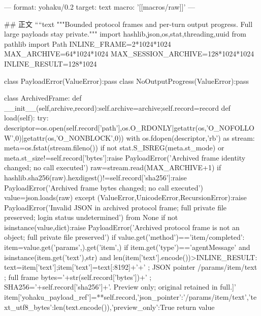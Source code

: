 ---
format: yohaku/0.2
target: text
macro: '[[macros/raw]]'
---

## 正文
````text
"""Bounded protocol frames and per-turn output progress. Full large payloads stay private."""
import hashlib,json,os,stat,threading,uuid
from pathlib import Path
INLINE_FRAME=2*1024*1024
MAX_ARCHIVE=64*1024*1024
MAX_SESSION_ARCHIVE=128*1024*1024
INLINE_RESULT=128*1024

class PayloadError(ValueError):pass
class NoOutputProgress(ValueError):pass

class ArchivedFrame:
 def __init__(self,archive,record):self.archive=archive;self.record=record
 def load(self):
  try:
   descriptor=os.open(self.record['path'],os.O_RDONLY|getattr(os,'O_NOFOLLOW',0)|getattr(os,'O_NONBLOCK',0))
   with os.fdopen(descriptor,'rb') as stream:
    meta=os.fstat(stream.fileno())
    if not stat.S_ISREG(meta.st_mode) or meta.st_size!=self.record['bytes']:raise PayloadError('Archived frame identity changed; no call executed')
    raw=stream.read(MAX_ARCHIVE+1)
   if hashlib.sha256(raw).hexdigest()!=self.record['sha256']:raise PayloadError('Archived frame bytes changed; no call executed')
   value=json.loads(raw)
  except (ValueError,UnicodeError,RecursionError):raise PayloadError('Invalid JSON in archived protocol frame; full private file preserved; login status undetermined') from None
  if not isinstance(value,dict):raise PayloadError('Archived protocol frame is not an object; full private file preserved')
  if value.get('method')=='item/completed':
   item=value.get('params',{}).get('item',{})
   if item.get('type')=='agentMessage' and isinstance(item.get('text'),str) and len(item['text'].encode())>INLINE_RESULT:
    text=item['text'];item['text']=text[:8192]+'\n[Large response continued in private payload file: '+self.record['path']+' ; JSON pointer /params/item/text ; full frame bytes='+str(self.record['bytes'])+' ; SHA256='+self.record['sha256']+'. Preview only; original retained in full.]'
    item['yohaku_payload_ref']={**self.record,'json_pointer':'/params/item/text','text_utf8_bytes':len(text.encode()),'preview_only':True}
  return value

